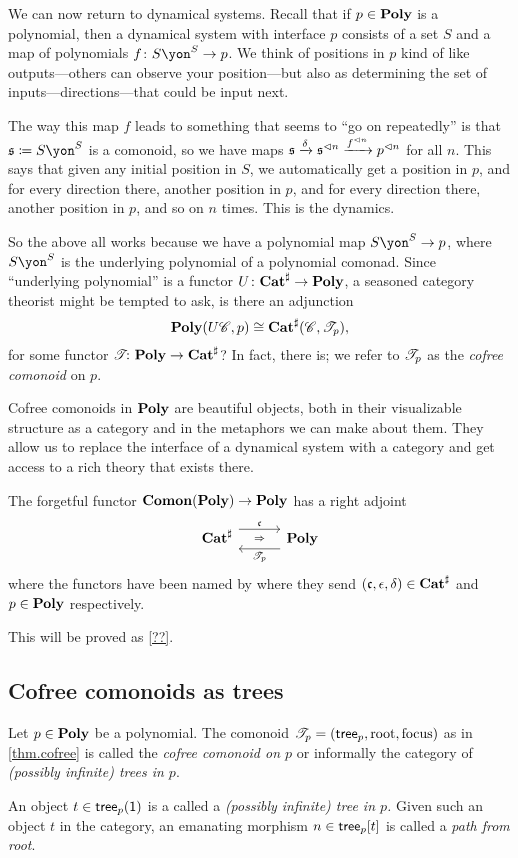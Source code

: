 \documentclass[DynamicalBook]{subfiles}
\begin{document}
We can now return to dynamical systems. Recall that if $p\in\textbf{Poly}$ is a polynomial, then a dynamical system with interface $p$ consists of a set $S$ and a map of polynomials $f\colon S\yon^S\to p$. We think of positions in $p$ kind of like outputs---others can observe your position---but also as determining the set of inputs---directions---that could be input next.

The way this map $f$ leads to something that seems to ``go on repeatedly'' is that $\ema{s}\coloneqq S\yon^S$ is a comonoid, so we have maps $\mathfrak{s}\xrightarrow{\delta}\mathfrak{s}^{\lhd n}\xrightarrow{f^{\lhd n}}p^{\lhd n}$ for all $n$. This says that given any initial position in $S$, we automatically get a position in $p$, and for every direction there, another position in $p$, and for every direction there, another position in $p$, and so on $n$ times. This is the dynamics.

So the above all works because we have a polynomial map $S\yon^S\to p$, where $S\yon^S$ is the underlying polynomial of a polynomial comonad. Since ``underlying polynomial'' is a functor $U\colon\textbf{Cat}^\sharp\to\textbf{Poly}$, a seasoned category theorist might be tempted to ask, is there an adjunction
\[
\textbf{Poly}(U\mathscr{C},p)\cong\textbf{Cat}^\sharp(\mathscr{C},\mathscr{T}_{p}),
\]
for some functor $\mathscr{T}_{}\colon\textbf{Poly}\to\textbf{Cat}^\sharp$? In fact, there is; we refer to $\mathscr{T}_{p}$ as the \emph{cofree comonoid} on $p$.

Cofree comonoids in $\textbf{Poly}$ are beautiful objects, both in their visualizable structure as a category and in the metaphors we can make about them. They allow us to replace the interface of a dynamical system with a category and get access to a rich theory that exists there.

\begin{theorem}\label{thm.cofree}
The forgetful functor $\textbf{Comon}(\textbf{Poly})\to\textbf{Poly}$ has a right adjoint
\[
  \adj{\smcat^\sharp}{\ema{c}}{\cofree{p}}{\poly}
\]
where the functors have been named by where they send $(\mathfrak{c},\epsilon,\delta)\in\textbf{Cat}^\sharp$ and $p\in\textbf{Poly}$ respectively.
\end{theorem}
This will be proved as \cref{??}.

\subsection{Cofree comonoids as trees}

\begin{definition}\label{def.cofree}
Let $p\in\textbf{Poly}$ be a polynomial. The comonoid $\mathscr{T}_{p}=(\mathsf{tree}_p,\mathrm{root},\mathrm{focus})$ as in \cref{thm.cofree} is called the \emph{cofree comonoid on $p$} or informally the category of \emph{(possibly infinite) trees in $p$}.

An object $t\in \mathsf{tree}_p(\textsf{1})$ is a called a \emph{(possibly infinite) tree in $p$.} Given such an object $t$ in the category, an emanating morphism $n\in\mathsf{tree}_p[t]$ is called a \emph{path from root}.
\end{definition}
\end{document}
